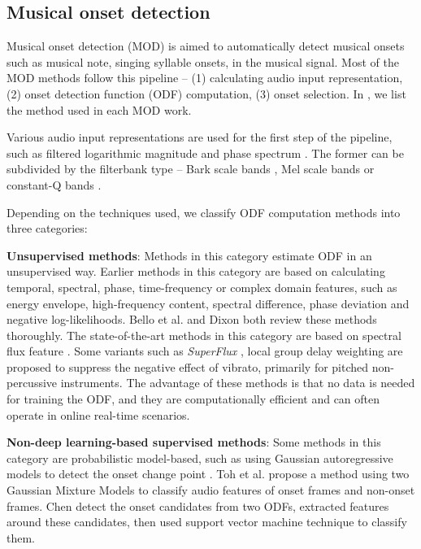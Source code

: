 \subsection{Musical onset detection}

Musical onset detection (MOD) is aimed to automatically detect musical onsets such as musical note, singing syllable onsets, in the musical signal. Most of the MOD methods follow this pipeline -- (1) calculating audio input representation, (2) onset detection function (ODF) computation, (3) onset selection. In , we list the method used in each MOD work.

Various audio input representations are used for the first step of the pipeline, such as filtered logarithmic magnitude and phase spectrum . The former can be subdivided by the filterbank type -- Bark scale bands , Mel scale bands  or constant-Q bands .

Depending on the techniques used, we classify ODF computation methods into three categories:

\noindent\textbf{Unsupervised methods}: Methods in this category estimate ODF in an unsupervised way. Earlier methods in this category are based on calculating temporal, spectral, phase, time-frequency or complex domain features, such as energy envelope, high-frequency content, spectral difference, phase deviation and negative log-likelihoods. Bello et al.  and Dixon  both review these methods thoroughly. The state-of-the-art methods in this category are based on spectral flux feature . Some variants such as \textit{SuperFlux} , local group delay weighting  are proposed to suppress the negative effect of vibrato, primarily for pitched non-percussive instruments. The advantage of these methods is that no data is needed for training the ODF, and they are computationally efficient and can often operate in online real-time scenarios.

\noindent\textbf{Non-deep learning-based supervised methods}: Some methods in this category are probabilistic model-based, such as using Gaussian autoregressive models to detect the onset change point . Toh et al.  propose a method using two Gaussian Mixture Models to classify audio features of onset frames and non-onset frames. Chen  detect the onset candidates from two ODFs, extracted features around these candidates, then used support vector machine technique to classify them.

